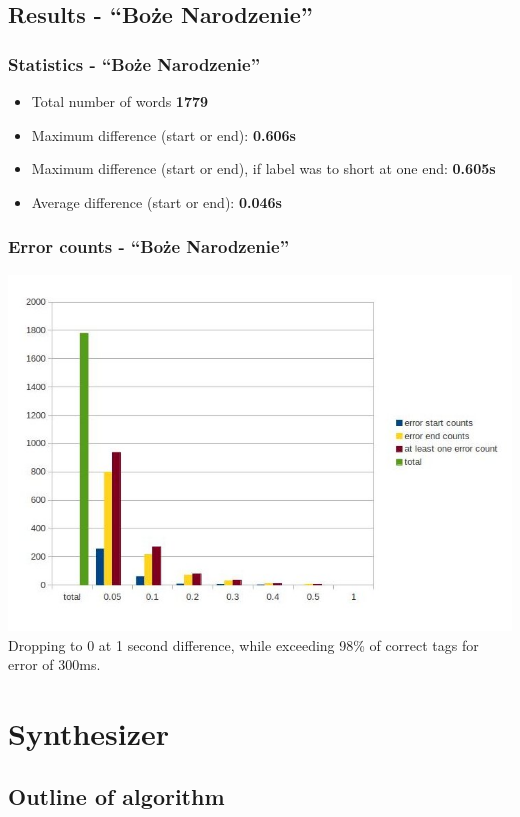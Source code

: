 \documentclass[]{beamer}
\begin{document}
\subsection{Results - “Boże Narodzenie”}
\begin{frame}
    \frametitle{Statistics - “Boże Narodzenie”}
    \begin{itemize}
        \item Total number of words				\textbf{1779}
        \item Maximum difference (start or end): 			\textbf{0.606s}
        \item Maximum difference (start or end), if label was to short at one end: 			\textbf{0.605s}
        \item Average difference  (start or end):			\textbf{0.046s}
    \end{itemize}
\end{frame}
\begin{frame}
    \frametitle{Error counts - “Boże Narodzenie”}
    \includegraphics[scale=0.37]{boze_narodzenie_length_based_counts.jpg}
    Dropping to 0 at 1 second difference, while exceeding 98\% of correct tags for error of 300ms.
\end{frame}

\section{Synthesizer}
\subsection{Outline of algorithm}
\begin{frame}
\end{frame}
\end{document}
